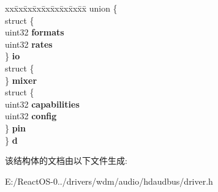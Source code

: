 \begin{DoxyCompactItemize}
\begin{tabbing}
\end{tabbing}\item 
\mbox{\label{structhda__widget_aaf396695003014fa722a458c65ff13f3}} 
\begin{tabbing}
xx\=xx\=xx\=xx\=xx\=xx\=xx\=xx\=xx\=\kill
union \{\\
\>struct \{\\
\>\>uint32 {\bfseries formats}\\
\>\>uint32 {\bfseries rates}\\
\>\} {\bfseries io}\\
\>struct \{\\
\>\} {\bfseries mixer}\\
\>struct \{\\
\>\>uint32 {\bfseries capabilities}\\
\>\>uint32 {\bfseries config}\\
\>\} {\bfseries pin}\\
\} {\bfseries d}\\

\end{tabbing}\end{DoxyCompactItemize}


该结构体的文档由以下文件生成\+:\begin{DoxyCompactItemize}
\item 
E\+:/\+React\+O\+S-\/0../drivers/wdm/audio/hdaudbus/driver.\+h\end{DoxyCompactItemize}
